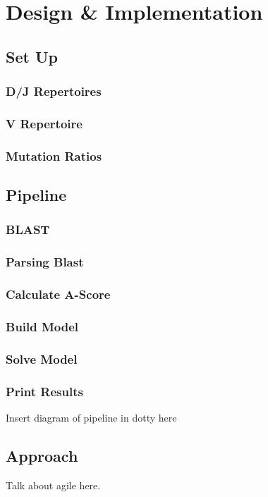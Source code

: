 \chapter{Design \& Implementation}

\section{Set Up}
\subsection{D/J Repertoires}
\subsection{V Repertoire}
\subsection{Mutation Ratios}

\section{Pipeline}
\subsection{BLAST}
\subsection{Parsing Blast}
\subsection{Calculate A-Score}
\subsection{Build Model}
\subsection{Solve Model}
\subsection{Print Results}

Insert diagram of pipeline in dotty here

\section{Approach}
Talk about agile here.

